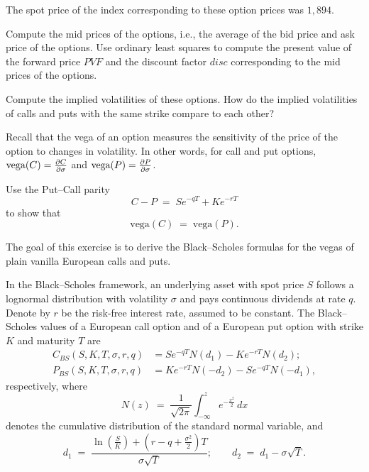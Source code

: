 \begin{exercises}
The spot price of the index corresponding to these option prices was $1,894$.

\begin{subparts}
\item Compute the mid prices of the options, i.e., the average of the bid price and ask
price of the options. Use ordinary least squares to compute the present value of the
forward price $PVF$ and the discount factor $disc$ corresponding to the mid prices of
the options.
\item Compute the implied volatilities of these options. How do the implied
volatilities of calls and puts with the same strike compare to each other?
\end{subparts}

\item Recall that the vega of an option measures the sensitivity of the price of the
option to changes in volatility. In other words, for call and put options,
$\text{vega}(C) = \frac{\partial C}{\partial \sigma}$ and $\text{vega}(P) = \frac{\partial P}{\partial \sigma}$.

Use the Put--Call parity
\[
C - P \;=\; Se^{-qT} + Ke^{-rT}
\]
to show that
\[
\text{vega}(C) \;=\; \text{vega}(P).
\]

\item The goal of this exercise is to derive the Black--Scholes formulas for the vegas
of plain vanilla European calls and puts.

In the Black--Scholes framework, an underlying asset with spot price $S$ follows a
lognormal distribution with volatility $\sigma$ and pays continuous dividends at rate
$q$. Denote by $r$ be the risk-free interest rate, assumed to be constant. The
Black--Scholes values of a European call option and of a European put option with
strike $K$ and maturity $T$ are
\begin{align*}
C_{BS}(S,K,T,\sigma,r,q) &= Se^{-qT}N(d_1) - Ke^{-rT}N(d_2);\\
P_{BS}(S,K,T,\sigma,r,q) &= Ke^{-rT}N(-d_2) - Se^{-qT}N(-d_1),
\end{align*}
respectively, where
\[
N(z) \;=\; \frac{1}{\sqrt{2\pi}}\int_{-\infty}^z e^{-\frac{x^2}{2}}\,dx
\]
denotes the cumulative distribution of the standard normal variable, and
\[
d_1 \;=\; \frac{\ln\left(\frac{S}{K}\right) + \left(r-q+\frac{\sigma^2}{2}\right)T}
{\sigma\sqrt{T}}; \qquad d_2 \;=\; d_1 - \sigma\sqrt{T}.
\]


\end{exercises}
